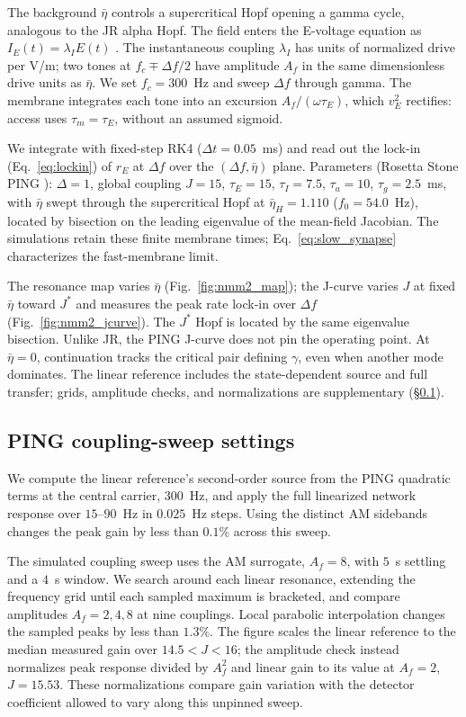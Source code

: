\documentclass[11pt,a4paper]{article}
\newif\ifjne
\begin{document}
The background $\bar\eta$ controls a supercritical Hopf opening a gamma
cycle, analogous to the JR alpha Hopf. The field enters the E-voltage
equation as $I_E(t)=\lambda_I E(t)$ \cite{ruffini2021nmm2}.
The instantaneous coupling $\lambda_I$ has units of normalized drive per V/m;
two tones at $f_c\mp\Delta f/2$ have amplitude $A_f$ in the same
dimensionless drive units as $\bar\eta$. We set $f_c=300$~Hz and sweep
$\Delta f$ through gamma. The membrane integrates each tone into an
excursion $A_f/(\omega\tau_E)$, which $v_E^2$ rectifies: access uses
$\tau_m=\tau_E$, without an assumed sigmoid.

We integrate with fixed-step RK4 ($\Delta t=0.05$~ms) and read out the lock-in
(Eq.~\eqref{eq:lockin}) of $r_E$ at $\Delta f$ over the $(\Delta f, \bar\eta)$ plane.
Parameters (Rosetta Stone PING \cite{ruffini2025rosetta}): $\Delta=1$, global coupling
$J=15$, $\tau_E=15$, $\tau_I=7.5$, $\tau_a=10$, $\tau_g=2.5$~ms, with $\bar\eta$ swept
through the supercritical Hopf at $\bar\eta_H=1.110$ ($f_0=54.0$~Hz), located by bisection
on the leading eigenvalue of the mean-field Jacobian. The simulations retain these
finite membrane times; Eq.~\eqref{eq:slow_synapse} characterizes the fast-membrane limit.

The resonance map varies $\bar\eta$ (Fig.~\ref{fig:nmm2_map}); the
J-curve varies $J$ at fixed $\bar\eta$ toward $J^*$ and measures the
peak rate lock-in over $\Delta f$ (Fig.~\ref{fig:nmm2_jcurve}).
The $J^*$ Hopf is located by the same eigenvalue bisection.
Unlike JR, the PING J-curve does not pin the operating point. At
$\bar\eta=0$, continuation tracks the critical pair defining $\gamma$,
even when another mode dominates. The linear reference includes the
state-dependent source and full transfer; grids, amplitude checks, and
normalizations are supplementary (\S\ref{supp:ping-runs}).

\ifjne\else
\subsection{PING coupling-sweep settings}\label{supp:ping-runs}
We compute the linear reference's
second-order source from the PING quadratic terms at the central carrier,
$300$~Hz, and apply the full linearized network response over $15$--$90$~Hz
in $0.025$~Hz steps. Using the distinct AM sidebands changes the peak gain by
less than $0.1\%$ across this sweep.

The simulated coupling sweep uses the AM surrogate, $A_f=8$, with $5$~s
settling and a $4$~s window. We search around each linear resonance, extending
the frequency grid until each sampled maximum is bracketed, and compare
amplitudes $A_f=2,4,8$ at nine couplings. Local parabolic interpolation changes
the sampled peaks by less than $1.3\%$. The figure scales the linear reference
to the median measured gain over $14.5<J<16$; the amplitude check instead
normalizes peak response divided by $A_f^2$ and linear gain to its value at
$A_f=2$, $J=15.53$. These normalizations compare gain variation with the detector coefficient
allowed to vary along this unpinned sweep.
\end{document}
